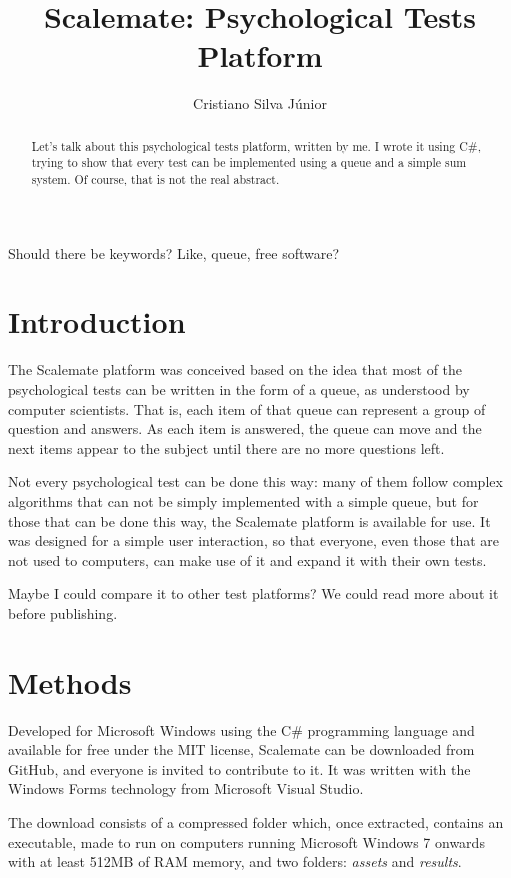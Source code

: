 \documentclass[12pt, a4paper, twoside]{article}
\begin{document}
\title{Scalemate: Psychological Tests Platform}
\author{Cristiano Silva Júnior}
\date{}
\maketitle

\begin{abstract}
Let's talk about this psychological tests platform, written by me. I wrote it
using C\#, trying to show that every test can be implemented using a queue
and a simple sum system. Of course, that is not the real abstract. 
\end{abstract}

Should there be keywords? Like, queue, free software?

\section{Introduction}

The Scalemate platform was conceived based on the idea that most of the psychological tests can be written in the form of a queue, as understood by computer scientists. That is, each item of that queue can represent a group of question and answers. As each item is answered, the queue can move and the next items appear to the subject until there are no more questions left. 

Not every psychological test can be done this way: many of them follow complex algorithms that can not be simply implemented with a simple queue, but for those that can be done this way, the Scalemate platform is available for use. It was designed for a simple user interaction, so that everyone, even those that are not used to computers, can make use of it and expand it with their own tests.

Maybe I could compare it to other test platforms? We could read more about it before publishing.

\section{Methods}

Developed for Microsoft Windows using the C\# programming language and available for free under the MIT license, Scalemate can be downloaded from GitHub, and everyone is invited to contribute to it. It was written with the Windows Forms technology from Microsoft Visual Studio.

The download consists of a compressed folder which, once extracted, contains an executable, made to run on computers running Microsoft Windows 7 onwards with at least 512MB of RAM memory, and two folders: \textit{assets} and \textit{results}. 
\end{document}
